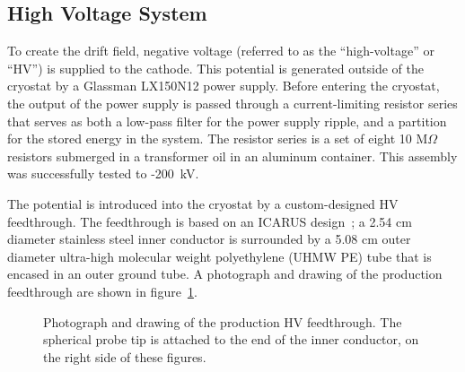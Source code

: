%
\subsection{High Voltage System}
\label{sec:hv}

To create the drift field, negative voltage (referred to as the ``high-voltage'' or ``HV'') is supplied to the \lartpc cathode.  This potential is generated outside of the cryostat by a Glassman LX150N12 power supply.  Before entering the cryostat, the output of the power supply is passed through a current-limiting resistor series that serves as both a low-pass filter for the power supply ripple, and a partition for the stored energy in the system.  The resistor series is a set of eight 10 M$\Omega$ resistors submerged in a transformer oil in an aluminum container.  This assembly was successfully tested to -200~kV. 

The potential is introduced into the cryostat by a custom-designed HV feedthrough.  The feedthrough is based on an ICARUS design~\cite{Amerio:2004-T600}; a 2.54 cm diameter stainless steel inner conductor is surrounded by a 5.08 cm outer diameter ultra-high molecular weight polyethylene (UHMW PE) tube that is encased in an outer ground tube.  A photograph and drawing of the production feedthrough are shown in figure~\ref{fig:hv_ftpic}.

\begin{figure}[htb]
\caption{Photograph and drawing of the production HV feedthrough. The spherical probe tip is attached to the end of the inner conductor, on the right side of these figures.}
\label{fig:hv_ftpic}
\end{figure}


